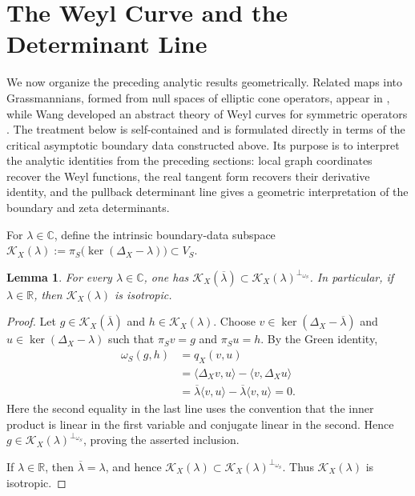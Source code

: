 \documentclass[12pt]{amsart}
\theoremstyle{plain}
\newtheorem{lem}[thm]{Lemma}
\theoremstyle{definition}
\theoremstyle{remark}
\numberwithin{equation}{section} \numberwithin{figure}{section}
\newcommand{\mb}[1]{\mathbb{#1}} %
\newcommand{\mc}[1]{\mathcal{#1}}
\begin{document}
\section{The Weyl Curve and the Determinant Line}
We now organize the preceding analytic results geometrically. Related
maps into Grassmannians, formed from null spaces of elliptic cone
operators, appear in \cite{GilKrainerMendoza2007}, while Wang developed an abstract
theory of Weyl curves for symmetric operators
\cite{WangWeylCurve}. The treatment below is self-contained and is
formulated directly in terms of the critical asymptotic boundary data
constructed above. Its purpose is to interpret the analytic identities
from the preceding sections: local graph coordinates recover the Weyl
functions, the real tangent form recovers their derivative identity,
and the pullback determinant line gives a geometric interpretation of
the boundary and zeta determinants.

For \(\lambda\in\mb C\), define the intrinsic boundary-data
subspace
\(\mc K_X(\lambda):=
\pi_S\bigl(\ker(\Delta_X-\lambda)\bigr)\subset V_S\).

\begin{lem}\label{lem:cauchy-data-orthogonality}
For every \(\lambda\in\mb C\), one has
\(\mc K_X(\overline{\lambda})
\subset\mc K_X(\lambda)^{\perp_{\omega_S}}\).
In particular, if \(\lambda\in\mb R\), then
\(\mc K_X(\lambda)\) is isotropic.
\end{lem}

\begin{proof}
Let \(g\in\mc K_X(\overline{\lambda})\) and
\(h\in\mc K_X(\lambda)\). Choose
\(v\in\ker(\Delta_X-\overline{\lambda})\) and
\(u\in\ker(\Delta_X-\lambda)\) such that
\(\pi_Sv=g\) and \(\pi_Su=h\). By the Green identity,
\[
\begin{aligned}
\omega_S(g,h)
&=
q_X(v,u) \\
&=
\langle\Delta_Xv,u\rangle
-
\langle v,\Delta_Xu\rangle \\
&=
\overline{\lambda}\langle v,u\rangle
-
\overline{\lambda}\langle v,u\rangle
=
0.
\end{aligned}
\]
Here the second equality in the last line uses the convention that
the inner product is linear in the first variable and conjugate
linear in the second. Hence
\(g\in\mc K_X(\lambda)^{\perp_{\omega_S}}\), proving the asserted
inclusion.

If \(\lambda\in\mb R\), then
\(\overline{\lambda}=\lambda\), and hence
\(\mc K_X(\lambda)
\subset\mc K_X(\lambda)^{\perp_{\omega_S}}\).
Thus \(\mc K_X(\lambda)\) is isotropic.
\end{proof}
\end{document}
